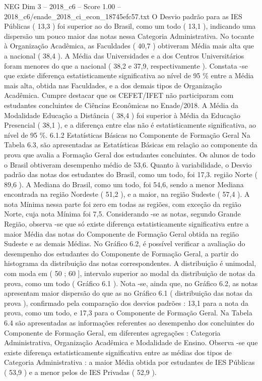 \begin{textsample}{NEG Dim 3 – 2018\_c6 – Score 1.00 – 2018\_c6/enade\_2018\_ci\_econ\_18745efc57.txt}
O Desvio padrão para as IES Públicas ( 13,3 ) foi superior ao do Brasil, como um todo ( 13,1 ), indicando uma dispersão um pouco maior das notas nessa Categoria Administrativa.
No tocante à Organização Acadêmica, as Faculdades ( 40,7 ) obtiveram Média mais alta que a nacional ( 38,4 ).
A Média das Universidades e a dos Centros Universitários foram menores do que a nacional ( 38,2 e 37,9, respectivamente ).
Constata -se que existe diferença estatisticamente significativa ao nível de 95 \% entre a Média mais alta, obtida nas Faculdades, e a dos demais tipos de Organização Acadêmica.
Cumpre destacar que os CEFET/IFET não participaram com estudantes concluintes de Ciências Econômicas no Enade/2018.
A Média da Modalidade Educação a Distância ( 38,4 ) foi superior à Média da Educação Presencial ( 38,1 ), e a diferença entre elas não é estatisticamente significativa, ao nível de 95 \%. 6.1.2 Estatísticas Básicas no Componente de Formação Geral Na Tabela 6.3, são apresentadas as Estatísticas Básicas em relação ao componente da prova que avalia a Formação Geral dos estudantes concluintes.
Os alunos de todo o Brasil obtiveram desempenho médio de 53,6.
Quanto à variabilidade, o Desvio padrão das notas dos estudantes do Brasil, como um todo, foi 17,3. região Norte ( 89,6 ).
A Mediana do Brasil, como um todo, foi 54,6, sendo a menor Mediana encontrada na região Nordeste ( 51,2 ), e a maior, na região Sudeste ( 57,4 ).
A nota Mínima nessa parte foi zero em todas as regiões, com exceção da região Norte, cuja nota Mínima foi 7,5.
Considerando -se as notas, segundo Grande Região, observa -se que só existe diferença estatisticamente significativa entre a maior Média das notas do Componente de Formação Geral obtida na região Sudeste e as demais Médias.
No Gráfico 6.2, é possível verificar a avaliação do desempenho dos estudantes do Componente de Formação Geral, a partir do histograma da distribuição das notas correspondentes.
A distribuição é unimodal, com moda em ( 50 ; 60 ], intervalo superior ao modal da distribuição de notas da prova, como um todo ( Gráfico 6.1 ).
Nota -se, ainda que, no Gráfico 6.2, as notas apresentam maior dispersão do que as no Gráfico 6.1 ( distribuição das notas da prova ), confirmado pela comparação dos desvios padrões : 13,1 para a nota da prova, como um todo, e 17,3 para o Componente de Formação Geral.
Na Tabela 6.4 são apresentadas as informações referentes ao desempenho dos concluintes do Componente de Formação Geral, em diferentes agregações : Categoria Administrativa, Organização Acadêmica e Modalidade de Ensino.
Observa -se que existe diferença estatisticamente significativa entre as médias dos tipos de Categoria Administrativa : a maior Média obtida por estudantes de IES Públicas ( 53,9 ) e a menor pelos de IES Privadas ( 52,9 ).

\end{textsample}
